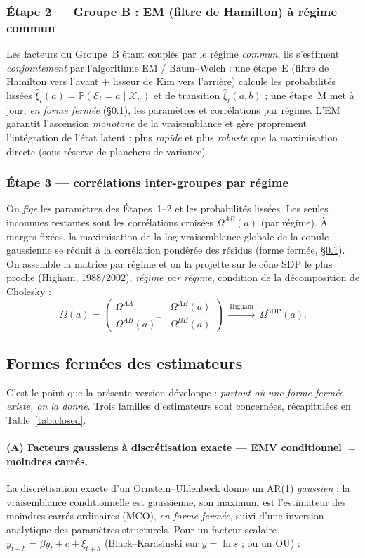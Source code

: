 \documentclass[11pt,a4paper]{article}
\theoremstyle{definition}
\newcommand{\Prob}{\mathbb{P}}
\newcommand{\Ecal}{\mathcal{E}}
\newcommand{\Xcal}{\mathcal{X}}
\newcommand{\transp}{^{\!\top}}
\begin{document}
\subsubsection{Étape 2 --- Groupe B : EM (filtre de Hamilton) à régime commun}
Les facteurs du Groupe~B étant couplés par le régime \emph{commun}, ils s'estiment \emph{conjointement} par l'algorithme EM / Baum--Welch : une étape~E (filtre de Hamilton vers l'avant $+$ lisseur de Kim vers l'arrière) calcule les probabilités lissées $\hat\xi_t(a)=\Prob(\Ecal_t=a\mid\Xcal_n)$ et de transition $\hat\xi_t(a,b)$ ; une étape~M met à jour, \emph{en forme fermée} (\S\ref{sec:closed}), les paramètres et corrélations par régime. L'EM garantit l'ascension \emph{monotone} de la vraisemblance et gère proprement l'intégration de l'état latent : plus \emph{rapide} et plus \emph{robuste} que la maximisation directe (sous réserve de planchers de variance).

\subsubsection{Étape 3 --- corrélations inter-groupes par régime}
On \emph{fige} les paramètres des Étapes~1--2 et les probabilités lissées. Les seules inconnues restantes sont les corrélations croisées $\Omega^{AB}(a)$ (par régime). À marges fixées, la maximisation de la log-vraisemblance globale de la copule gaussienne se réduit à la corrélation pondérée des résidus (forme fermée, \S\ref{sec:closed}). On assemble la matrice par régime et on la projette sur le cône SDP le plus proche (Higham, 1988/2002), \emph{régime par régime}, condition de la décomposition de Cholesky :
\[
\Omega(a)=\begin{pmatrix}\Omega^{AA} & \Omega^{AB}(a)\\[2pt] \Omega^{AB}(a)\transp & \Omega^{BB}(a)\end{pmatrix}
\ \xrightarrow{\ \text{Higham}\ }\ \Omega^{\mathrm{SDP}}(a).
\]

\subsection{Formes fermées des estimateurs}
\label{sec:closed}

C'est le point que la présente version développe : \emph{partout où une forme fermée existe, on la donne}. Trois familles d'estimateurs sont concernées, récapitulées en Table~\ref{tab:closed}.

\paragraph{(A) Facteurs gaussiens à discrétisation exacte --- EMV conditionnel $=$ moindres carrés.}
La discrétisation exacte d'un Ornstein--Uhlenbeck donne un AR(1) \emph{gaussien} : la vraisemblance conditionnelle est gaussienne, son maximum est l'estimateur des moindres carrés ordinaires (MCO), \emph{en forme fermée}, suivi d'une inversion analytique des paramètres structurels. Pour un facteur scalaire $y_{t+h}=\beta y_t+c+\xi_{t+h}$ (Black--Karasinski sur $y=\ln s$ ; ou un OU) :
\end{document}
